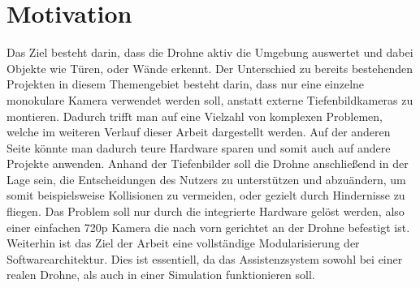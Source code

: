 \section{Motivation}
Das Ziel besteht darin, dass die Drohne aktiv die Umgebung auswertet und dabei Objekte wie Türen, oder Wände erkennt. Der Unterschied zu bereits bestehenden Projekten in diesem Themengebiet besteht darin, dass nur eine einzelne monokulare Kamera verwendet werden soll, anstatt externe Tiefenbildkameras zu montieren. \newline
Dadurch trifft man auf eine Vielzahl von komplexen Problemen, welche im weiteren Verlauf dieser Arbeit dargestellt werden. Auf der anderen Seite könnte man dadurch teure Hardware sparen und somit auch auf andere Projekte anwenden. \newline
Anhand der Tiefenbilder soll die Drohne anschließend in der Lage sein, die Entscheidungen des Nutzers zu unterstützen und abzuändern, um somit beispielsweise Kollisionen zu vermeiden, oder gezielt durch Hindernisse zu fliegen. \newline
Das Problem soll nur durch die integrierte Hardware gelöst werden, also einer einfachen 720p Kamera die nach vorn gerichtet an der Drohne befestigt ist. Weiterhin ist das Ziel der Arbeit eine vollständige Modularisierung der Softwarearchitektur. Dies ist essentiell, da das Assistenzsystem sowohl bei einer realen Drohne, als auch in einer Simulation funktionieren soll. 
